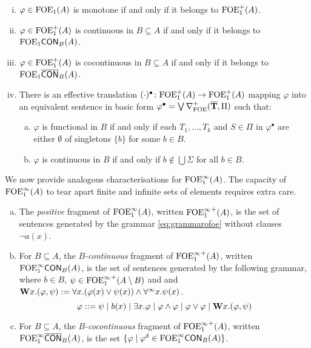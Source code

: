 \begin{theorem} \label{th:ofoe-normalforms} 
\begin{enumerate}[(i)]
\item $\varphi  \in \mathrm{FOE}_1(A)$ is monotone if and only if it belongs to $\mathrm{FOE}_1^{+}(A)$. 
\item $\varphi  \in \mathrm{FOE}_1^{+}(A)$ is continuous in $B \subseteq A$ if and only if it belongs to $\mathrm{FOE}_1\mathsf{CON}_{B}(A)$. 
\item $\varphi  \in \mathrm{FOE}_1^{+}(A)$ is cocontinuous in $B \subseteq A$ if and only if it belongs to $\mathrm{FOE}_1\overline{\mathsf{CON}}_{B}(A)$. 
\item There is an effective translation $(\cdot)^{\bullet} \colon \mathrm{FOE}_1^{+}(A) \to \mathrm{FOE}_1^{+}(A)$ mapping $\varphi$ into an equivalent sentence in basic form $\varphi^{\bullet} = \bigvee \nabla^+_{\mathrm{FOE}}(\overline{{\mathbf{T}}},\Pi)$ such that:
\begin{enumerate}[(a)]
\item $\varphi$ is functional in $B$ if and only if each $T_1, \dots, T_k$ and $S \in \Pi$ in $\varphi^{\bullet}$ are either $\emptyset$ of singletons $\{b\}$ for some $b \in B$.
\item $\varphi$ is continuous in $B$ if and only if $b\notin \bigcup\Sigma$ for all $b \in B$.
\end{enumerate}
\end{enumerate}
\end{theorem}




We now provide analogous characterisations for $\mathrm{FOE}^{\infty}_1(A)$. The capacity of $\mathrm{FOE}^{\infty}_1(A)$ to tear apart finite and infinite sets of elements requires extra care.

\begin{definition}
\begin{enumerate}[(a)]
\item The \emph{positive} fragment of $\mathrm{FOE}^{\infty}_1(A)$, written ${\mathrm{FOE}^{\infty}_1}^{+}(A)$, is the set of sentences generated by the grammar \eqref{eq:grammarofoe} without clauses $\lnot a(x)$. 
\item For $B \subseteq A$, the \emph{$B$-continuous} fragment of ${\mathrm{FOE}^{\infty}_1}^{+}(A)$, written $\mathrm{FOE}^{\infty}_1\mathsf{CON}_{B}(A)$, is the set of sentences generated by the following grammar, where $b \in B$, $\psi \in {\ensuremath{\mathrm{FOE}^{\infty}_1}}^{+}(A \setminus B)$ and and $\mathbf{W} x.(\varphi,\psi) \mathrel{: =} \forall x.(\varphi(x) \lor \psi(x)) \land \forall^\infty x.\psi(x)$.
\[
\varphi ::= \psi \mid b(x) \mid \exists x.\varphi \mid \varphi \land \varphi \mid \varphi \lor \varphi \mid \mathbf{W} x.(\varphi,\psi)
\]
\item For $B \subseteq A$, the \emph{$B$-cocontinuous} fragment of ${\mathrm{FOE}^{\infty}_1}^{+}(A)$, written $\mathrm{FOE}^{\infty}_1\overline{\mathsf{CON}}_{B}(A)$, is the set $\{\varphi \mid \varphi^\delta \in \mathrm{FOE}^{\infty}_1\mathsf{CON}_{B}(A)\}$.
\end{enumerate}
\end{definition}

